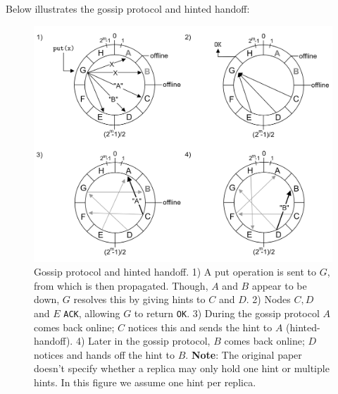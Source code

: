     \newpage 
    \noindent
    Below illustrates the gossip protocol and hinted handoff:
    \begin{figure}[h]
        
        \centering
        \includegraphics[width=\textwidth]{Sections/dyn/gossip_2.png}
        \caption{Gossip protocol and hinted handoff. 1) A put operation is sent to $G$, from which is then propagated. Though, $A$ and $B$ appear to be down, $G$ resolves this by giving hints to $C$ and $D$. 2) Nodes $C,D$ and $E$ \texttt{ACK}, allowing $G$ to return \texttt{OK}. 3) During the gossip protocol $A$ comes back online; $C$ notices this and sends the hint to $A$ (hinted-handoff). 4) Later in the 
        gossip protocol, $B$ comes back online; $D$ notices and hands off the hint to $B$. \textbf{Note}: The original paper doesn't specify whether a replica may only hold one hint or multiple hints. In this 
        figure we assume one hint per replica.}
        \label{fig:gossip}
    \end{figure}


    

